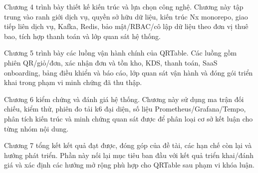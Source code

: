 Chương 4 trình bày thiết kế kiến trúc và lựa chọn công nghệ. Chương này tập trung vào ranh giới dịch vụ, quyền sở hữu dữ liệu, kiến trúc Nx monorepo, giao tiếp liên dịch vụ, Kafka, Redis, bảo mật/RBAC/cô lập dữ liệu theo đơn vị thuê bao, tích hợp thanh toán và lớp quan sát hệ thống.

Chương 5 trình bày các luồng vận hành chính của QRTable. Các luồng gồm phiên QR/giỏ/đơn, xác nhận đơn và tồn kho, KDS, thanh toán, SaaS onboarding, bảng điều khiển và báo cáo, lớp quan sát vận hành và đóng gói triển khai trong phạm vi minh chứng đã thu thập.

Chương 6 kiểm chứng và đánh giá hệ thống. Chương này sử dụng ma trận đối chiếu, kiểm thử, phiên đo tải k6 đại diện, số liệu Prometheus/Grafana/Tempo, phân tích kiến trúc và minh chứng quan sát được để phân loại cơ sở kết luận cho từng nhóm nội dung.

Chương 7 tổng kết kết quả đạt được, đóng góp của đề tài, các hạn chế còn lại và hướng phát triển. Phần này nối lại mục tiêu ban đầu với kết quả triển khai/đánh giá và xác định các hướng mở rộng phù hợp cho QRTable sau phạm vi khóa luận.
